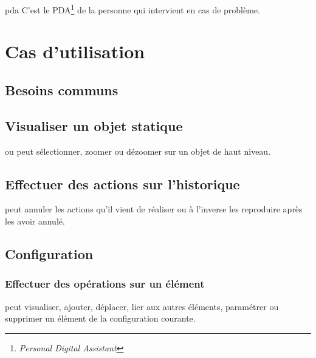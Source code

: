 {pda}
{C'est le PDA\footnote{\textsl{Personal Digital Assistant}} de la personne qui intervient en cas de problème.}



\section{Cas d'utilisation}

\subsection{Besoins communs}

\subsection{Visualiser un objet statique}
 ou  peut sélectionner, zoomer ou dézoomer sur un objet de haut niveau.

\subsection{Effectuer des actions sur l'historique}
 peut annuler les actions qu'il vient de réaliser ou à l'inverse les reproduire après les avoir annulé.

\subsection{Configuration}

\subsubsection{Effectuer des opérations sur un élément}
 peut visualiser, ajouter, déplacer, lier aux autres éléments, paramétrer ou supprimer un élément de la configuration courante.

